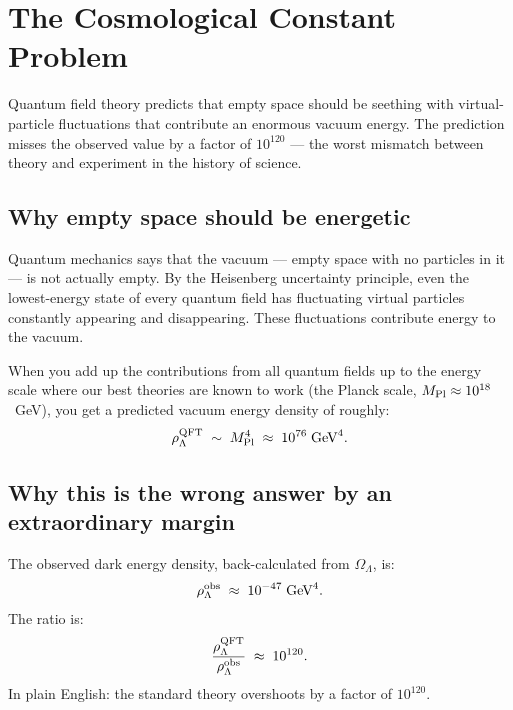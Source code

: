 \documentclass[11pt,a4paper]{article}
\newcommand{\OmL}{\Omega_\Lambda}
\begin{document}
\section{The Cosmological Constant Problem}

\begin{tcolorbox}[colback=boxorange,colframe=orange!60!black,
  title={Key idea}]
Quantum field theory predicts that empty space should be seething with
virtual-particle fluctuations that contribute an enormous vacuum energy.
The prediction misses the observed value by a factor of
$10^{120}$ --- the worst mismatch between theory and experiment in the
history of science.
\end{tcolorbox}

\subsection{Why empty space should be energetic}

Quantum mechanics says that the vacuum --- empty space with no particles in it
--- is not actually empty.  By the Heisenberg uncertainty principle, even the
lowest-energy state of every quantum field has fluctuating virtual particles
constantly appearing and disappearing.  These fluctuations contribute energy
to the vacuum.

When you add up the contributions from all quantum fields up to the
energy scale where our best theories are known to work (the Planck scale,
$M_{\rm Pl} \approx 10^{18}$~GeV), you get a predicted vacuum energy density
of roughly:
\[
  \rho_\Lambda^{\rm QFT} \;\sim\; M_{\rm Pl}^4
  \;\approx\; 10^{76}\;\text{GeV}^4.
\]

\subsection{Why this is the wrong answer by an extraordinary margin}

The observed dark energy density, back-calculated from $\OmL$, is:
\[
  \rho_\Lambda^{\rm obs}
  \;\approx\; 10^{-47}\;\text{GeV}^4.
\]
The ratio is:
\[
  \frac{\rho_\Lambda^{\rm QFT}}{\rho_\Lambda^{\rm obs}}
  \;\approx\; 10^{120}.
\]
In plain English: the standard theory overshoots by a factor of
$10^{120}$.
\end{document}
